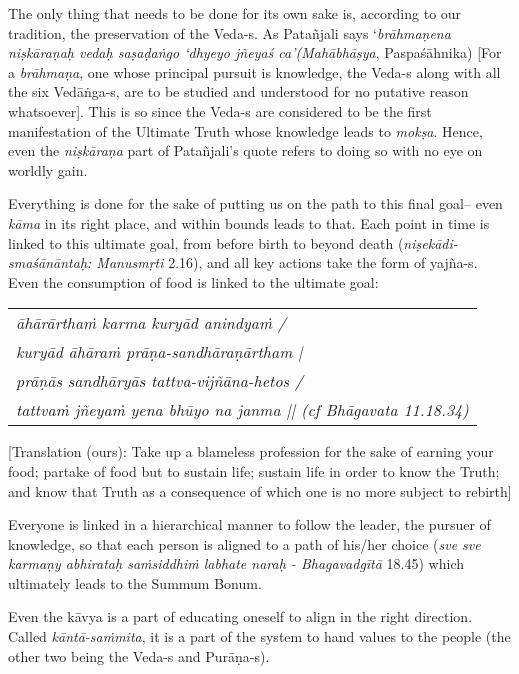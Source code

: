 The only thing that needs to be done for its own sake is, according to our tradition, the preservation of the Veda-s. As Patañjali says ‘{\sl brāhmaṇena niṣkāraṇaḥ vedaḥ saṣaḍaṅgo ‘dhyeyo jñeyaś ca’(Mahābhāṣya}, Paspaśāhnika) [For a {\sl brāhmaṇa}, one whose principal pursuit is knowledge, the Veda-s along with all the six Vedāṅga-s, are to be studied and understood for no putative reason whatsoever]. This is so since the Veda-s are considered to be the first manifestation of the Ultimate Truth whose knowledge leads to {\sl mokṣa}. Hence, even the {\sl niṣkāraṇa} part of Patañjali’s quote refers to doing so with no eye on worldly gain.

Everything is done for the sake of putting us on the path to this final goal– even {\sl kāma} in its right place, and within bounds leads to that. Each point in time is linked to this ultimate goal, from before birth to beyond death ({\sl niṣekādi-smaśānāntaḥ: Manusmṛti} 2.16), and all key actions take the form of yajña-s. Even the consumption of food is linked to the ultimate goal:  
\begin{center}
\begin{tabular}{>{\sl}l}
āhārārthaṁ karma kuryād anindyaṁ / \\
kuryād āhāraṁ prāṇa-sandhāraṇārtham | \\
prāṇās sandhāryās tattva-vijñāna-hetos / \\
tattvaṁ jñeyaṁ yena bhūyo na janma || (cf Bhāgavata\index{Bhāgavata} 11.18.34) 
\end{tabular}
\end{center}
[Translation (ours): Take up a blameless profession  for the sake of earning your food; partake of food but to sustain life; sustain life in order to know the Truth; and know that Truth as a consequence of which one is no more subject to rebirth]

Everyone is linked in a hierarchical manner to follow the leader, the pursuer of knowledge, so that each person is aligned to a path of his/her choice ({\sl sve sve karmaṇy abhirataḥ saṁsiddhiṁ labhate naraḥ - Bhagavadgītā} 18.45) which ultimately leads to the Summum Bonum. 

Even the kāvya is a part of educating oneself to align in the right direction. Called {\sl kāntā-saṁmita}, it is a part of the system to hand values to the people (the other two being the Veda-s and Purāṇa-s).
\vskip -40pt

